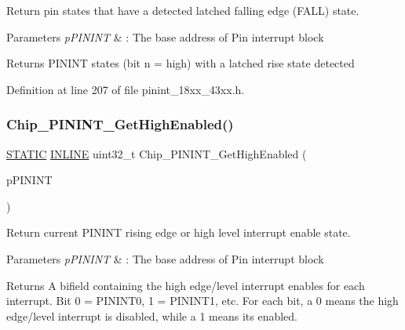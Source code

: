 Return pin states that have a detected latched falling edge (F\+A\+LL) state. 


\begin{DoxyParams}{Parameters}
{\em p\+P\+I\+N\+I\+NT} & \+: The base address of Pin interrupt block \\
\hline
\end{DoxyParams}
\begin{DoxyReturn}{Returns}
P\+I\+N\+I\+NT states (bit n = high) with a latched rise state detected 
\end{DoxyReturn}


Definition at line 207 of file pinint\+\_\+18xx\+\_\+43xx.\+h.

\mbox{\label{group___p_i_n_i_n_t__18_x_x__43_x_x_ga25520f739f79f23c523c02cc8376dc94}} 
\subsubsection{\texorpdfstring{Chip\+\_\+\+P\+I\+N\+I\+N\+T\+\_\+\+Get\+High\+Enabled()}{Chip\_PININT\_GetHighEnabled()}}
{\footnotesize\ttfamily \hyperlink{group___l_p_c___types___public___macros_ga10b2d890d871e1489bb02b7e70d9bdfb}{S\+T\+A\+T\+IC} \hyperlink{spifi__18xx__43xx_8h_a2eb6f9e0395b47b8d5e3eeae4fe0c116}{I\+N\+L\+I\+NE} uint32\+\_\+t Chip\+\_\+\+P\+I\+N\+I\+N\+T\+\_\+\+Get\+High\+Enabled (\begin{DoxyParamCaption}\item[{\hyperlink{struct_l_p_c___p_i_n___i_n_t___t}{L\+P\+C\+\_\+\+P\+I\+N\+\_\+\+I\+N\+T\+\_\+T} $\ast$}]{p\+P\+I\+N\+I\+NT }\end{DoxyParamCaption})}



Return current P\+I\+N\+I\+NT rising edge or high level interrupt enable state. 


\begin{DoxyParams}{Parameters}
{\em p\+P\+I\+N\+I\+NT} & \+: The base address of Pin interrupt block \\
\hline
\end{DoxyParams}
\begin{DoxyReturn}{Returns}
A bifield containing the high edge/level interrupt enables for each interrupt. Bit 0 = P\+I\+N\+I\+N\+T0, 1 = P\+I\+N\+I\+N\+T1, etc. For each bit, a 0 means the high edge/level interrupt is disabled, while a 1 means it\textquotesingle{}s enabled. 
\end{DoxyReturn}


